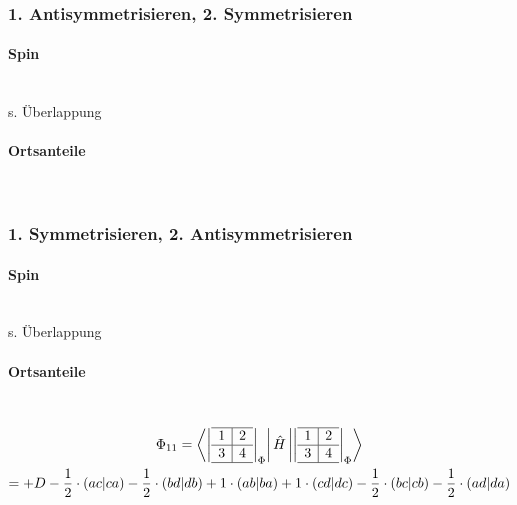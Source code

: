 \documentclass[12pt,a4paper]{article}
\begin{document}
 \subsubsection{1. Antisymmetrisieren, 2. Symmetrisieren}
  \paragraph{Spin}$ $ \\
  s. Überlappung
 \paragraph{Ortsanteile}$ $ \\
 \subsubsection{1. Symmetrisieren, 2. Antisymmetrisieren }
  \paragraph{Spin}$ $ \\
  s. Überlappung
 \paragraph{Ortsanteile}$ $ \\
  \begin{gather}
\Phi_{11} = \bra{
\left|
  \begin{array}{c|c}
  \hline 
    1 & 2 \\ \hline 
    3 & 4 \\
    \hline 
  \end{array}
\right| _{\Phi}
} \hat{H} \ket{
\left|
  \begin{array}{c|c}
  \hline 
    1 & 2 \\ \hline 
    3 & 4 \\
    \hline 
  \end{array}
\right| _{\Phi}
} \\
 = + D - \frac{1}{2} \cdot (ac|ca) - \frac{1}{2} \cdot (bd|db) + 1 \cdot (ab|ba) + 1 \cdot (cd|dc) - \frac{1}{2} \cdot (bc|cb) - \frac{1}{2} \cdot (ad|da) 
 \end{gather} \\
\end{document}
